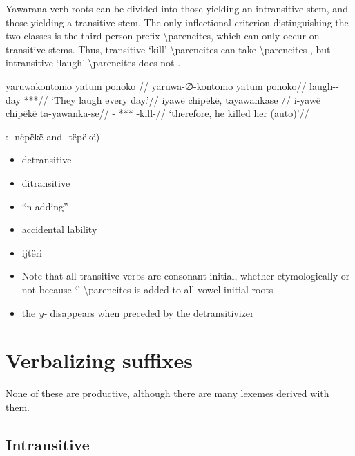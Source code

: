 \documentclass{memoir}
\begin{document}
Yawarana verb roots can be divided into those yielding an intransitive
stem, and those yielding a transitive stem. The only inflectional
criterion distinguishing the two classes is the third person prefix
 \textbackslash parencites, which can only occur on transitive
stems. Thus, transitive  `kill' \textbackslash parencites
can take  \textbackslash parencites ,
but intransitive  `laugh' \textbackslash parencites does not
.

\pex\label{}    \a     \label{convrisamaj-42}        \begingl
        \glpreamble yaruwakontomo yatum ponoko //
        \gla yaruwa-∅-kontomo yatum ponoko//
        \glb laugh-- day ***//
            \glft ‘They laugh every day.’//  
        \endgl 
    \a     \label{convfemgrme-217}        \begingl
        \glpreamble iyawë chipëkë, tayawankase //
        \gla i-yawë chipëkë ta-yawanka-se//
        \glb {}- *** -kill-//
            \glft ‘therefore, he killed her (auto)’//  
        \endgl 
\xe

: -nëpëkë and -tëpëkë)

\begin{itemize}
\item
  detransitive
\item
  ditransitive
\item
  ``n-adding''
\item
  accidental lability
\item
  ijtëri
\item
  Note that all transitive verbs are consonant‑initial, whether
  etymologically or not because  `'
  \textbackslash parencites is added to all vowel‑initial roots
\item
  the \emph{y‑} disappears when preceded by the detransitivizer
\end{itemize}

\section{\texorpdfstring{Verbalizing suffixes
\label{sec:vbz}}{Verbalizing suffixes }}

None of these are productive, although there are many lexemes derived
with them.

\subsection{Intransitive}
\end{document}
